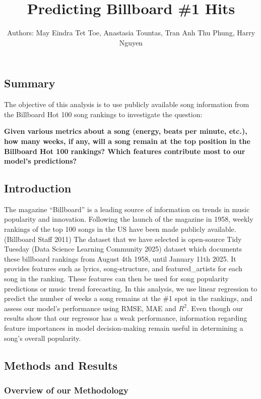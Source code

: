 \documentclass[
]{article}
\title{Predicting Billboard \#1 Hits}
\author{}
\date{\vspace{-2.5em}Authors: May Eindra Tet Toe, Anastasia Tountas, Tran Anh Thu
Phung, Harry Nguyen}
\begin{document}
\maketitle

\subsection{Summary}\label{summary}

The objective of this analysis is to use publicly available song
information from the Billboard Hot 100 song rankings to investigate the
question:

\textbf{Given various metrics about a song (energy, beats per minute,
etc.), how many weeks, if any, will a song remain at the top position in
the Billboard Hot 100 rankings? Which features contribute most to our
model's predictions?}

\subsection{Introduction}\label{introduction}

The magazine ``Billboard'' is a leading source of information on trends
in music popularity and innovation. Following the launch of the magazine
in 1958, weekly rankings of the top 100 songs in the US have been made
publicly available. (Billboard Staff 2011) The dataset that we have
selected is open-source Tidy Tuesday (Data Science Learning Community
2025) dataset which documents these billboard rankings from August 4th
1958, until January 11th 2025. It provides features such as lyrics,
song-structure, and featured\_artists for each song in the ranking.
These features can then be used for song popularity predictions or music
trend forecasting. In this analysis, we use linear regression to predict
the number of weeks a song remains at the \#1 spot in the rankings, and
assess our model's performance using RMSE, MAE and \(R^2\). Even though
our results show that our regressor has a weak performance, information
regarding feature importances in model decision-making remain useful in
determining a song's overall popularity.

\subsection{Methods and Results}\label{methods-and-results}

\subsubsection{Overview of our
Methodology}\label{overview-of-our-methodology}
\end{document}
